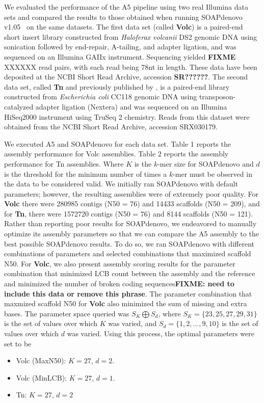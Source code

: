 \documentclass{bioinfo}
\begin{document}
We evaluated the performance of the A5 pipeline using two real Illumina data sets and compared the results to
those obtained when running SOAPdenovo v1.05~\citep{Li2010} on the same datasets. The first data set (called \textbf{Volc}) is a paired-end short insert library constructed from \emph{Haloferax volcanii} DS2 genomic DNA 
using sonication followed by end-repair, A-tailing, and adapter ligation, and was sequenced on an Illumina GAIIx instrument.
Sequencing yielded \textbf{FIXME} XXXXXX read pairs, with each read being 78nt in length. These data have been deposited at the NCBI Short Read Archive, accession \textbf{SR??????}. 
The second data set, called \textbf{Tn} and previously published by \citet{Adey2010}, is a paired-end library constructed from \emph{Escherichia coli} CC118 genomic DNA
using transposon-catalyzed adapter ligation (Nextera) and was sequenced on an Illumina HiSeq2000 instrument using TruSeq 2 chemistry. 
Reads from this dataset were obtained from the NCBI Short Read Archive, accession SRX030179.

We executed A5 and SOAPdenovo for each data set. Table 1 reports the assembly performance for Volc assemblies.
Table 2 reports the assembly performance for Tn assemblies. 
Where $K$ is the $k$-mer size for SOAPdenovo and $d$ is the threshold for the minimum number of times a $k$-mer must be observed in the data to be considered valid.
We initially ran SOAPdenovo with default parameters; however, the resulting assemblies were of extremely poor quality. For \textbf{Volc} there were
280985 contigs (N50 = 76) and 14433 scaffolds (N50 = 209), and for \textbf{Tn}, there were 1572720 contigs (N50 = 76) and 8144 scaffolds (N50 = 121). 
Rather than reporting poor results for SOAPdenovo, we endeavored to manually optimize its assembly parameters so that we can compare the A5 assembly to the best possible SOAPdenovo results. 
To do so, we ran SOAPdenovo with different combinations of parameters and selected combinations that maximized scaffold N50. For \textbf{Volc},
we also present assembly scoring results for the parameter combination that minimized LCB count between the assembly and the reference and minimized
the number of broken coding sequences\textbf{FIXME: need to include this data or remove this phrase}. The parameter combination that maxmized scaffold N50 for \textbf{Volc} also minimized the sum
of missing and extra bases. The parameter space queried was $S_K \bigoplus S_d$,
where $S_K = \{23,25,27,29,31\}$ is the set of values over which $K$ was varied, and $S_d = \{1,2,...,9,10\}$ is the set of values over which $d$
was varied. Using this process, the optimal parameters were set to be
\begin{itemize}
\item Volc (MaxN50): $K = 27$, $d = 2$.
\item Volc (MinLCB): $K = 27$, $d = 1$.
\item Tn: $K = 27$, $d = 2$
\end{itemize}
\end{document}
